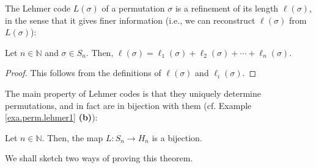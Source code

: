 The Lehmer code $L\left(  \sigma\right)  $ of a permutation $\sigma$ is a
refinement of its length $\ell\left(  \sigma\right)  $, in the sense that it
gives finer information (i.e., we can reconstruct $\ell\left(  \sigma\right)
$ from $L\left(  \sigma\right)  $):

\begin{proposition}
\label{prop.perm.lehmer.l}Let $n\in\mathbb{N}$ and $\sigma\in S_{n}$. Then,
$\ell\left(  \sigma\right)  =\ell_{1}\left(  \sigma\right)  +\ell_{2}\left(
\sigma\right)  +\cdots+\ell_{n}\left(  \sigma\right)  $.
\end{proposition}

\begin{proof}
This follows from the definitions of $\ell\left(  \sigma\right)  $ and
$\ell_{i}\left(  \sigma\right)  $.
\end{proof}

The main property of Lehmer codes is that they uniquely determine
permutations, and in fact are in bijection with them (cf. Example
\ref{exa.perm.lehmer1} \textbf{(b)}):

\begin{theorem}
\label{thm.perm.lehmer.bij}Let $n\in\mathbb{N}$. Then, the map $L:S_{n}%
\rightarrow H_{n}$ is a bijection.
\end{theorem}

We shall sketch two ways of proving this theorem.

